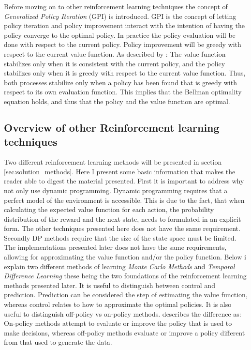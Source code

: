  Before moving on to other reinforcement learning techniques the concept of \textit{Generalized Policy Iteration} (GPI) is introduced. GPI is the concept of letting policy iteration and policy improvement interact with the intention of having the policy converge to the optimal policy. In practice the policy evaluation will be done with respect to the current policy. Policy improvement will be greedy with respect to the current value function. As described by \textcite{sutton_reinforcement_2018}: The value function stabilizes only when it is consistent with the current policy, and the policy stabilizes
only when it is greedy with respect to the current value function.
Thus, both processes stabilize only when a policy has been found that is greedy with respect to its own evaluation function. This implies that the Bellman optimality equation holds, and thus that the policy and the value function are optimal.
 
 \subsection{Overview of other Reinforcement learning techniques}
 
Two different reinforcement learning methods will be presented in section \ref{sec:solution_methods}. Here I present some basic information that makes the reader able to digest the material presented. First it is important to address why not only use dynamic programming. Dynamic programming requires that a perfect model of the environment is accessible. This is due to the fact, that when calculating the expected value function for each action, the probability distribution of the reward and the next state, needs to formulated in an explicit form. The other techniques presented here does not have the same requirement. Secondly DP methods require that the size of the state space must be limited. The implementations presented later does not have the same requirements, allowing for approximating the value function and/or the policy function. Below i explain two different methods of learning \textit{Monte Carlo Methods} and \textit{Temporal Difference Learning} these being the two foundations of the reinforcement learning methods presented later. It is useful to distinguish between control and prediction. Prediction can be considered the step of estimating the value function, whereas control relates to how to approximate the optimal policies. It is also useful to distinguish off-policy vs on-policy methods. \parencite{sutton_reinforcement_2018} describes the difference as: On-policy methods attempt to evaluate or improve the policy that is used to make decisions, whereas off-policy methods evaluate or improve a policy different from that used to generate the data.

